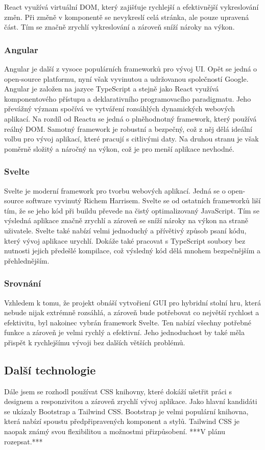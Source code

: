React využívá virtuální DOM, který zajišťuje rychlejší a efektivnější vykreslování změn. Při změně v komponentě se nevykreslí celá stránka, ale pouze upravená část. Tím se značně zrychlí vykreslování a zároveň sníží nároky na výkon.\cite{what_react_is_and_why_it_matters, angular_vs_react}

\subsubsection{Angular}
Angular je další z vysoce populárních frameworků pro vývoj UI. Opět se jedná o open-source platformu, nyní však vyvinutou a udržovanou společností Google. Angular je založen na jazyce TypeScript a stejně jako React využívá komponentového přístupu a deklarativního programovacího paradigmatu. Jeho převážný význam spočívá ve vytváření rozsáhlých dynamických webových aplikací. Na rozdíl od Reactu se jedná o plněhodnotný framework, který používá reálný DOM. Samotný framework je robustní a bezpečný, což z něj dělá ideální volbu pro vývoj aplikací, které pracují s citlivými daty. Na druhou stranu je však poměrně složitý a náročný na výkon, což je pro menší aplikace nevhodné.\cite{angular_vs_react, what_is_angular}

\subsubsection{Svelte}
Svelte je moderní framework pro tvorbu webových aplikací. Jedná se o open-source software vyvinutý Richem Harrisem. Svelte se od ostatních frameworků liší tím, že se jeho kód při buildu převede na čistý optimalizovaný JavaScript. Tím se výsledná aplikace značně zrychlí a zároveň se sníží nároky na výkon na straně uživatele. Svelte také nabízí velmi jednoduchý a přívětivý způsob psaní kódu, který vývoj aplikace urychlí. Dokáže také pracovat s TypeScript soubory bez nutnosti jejich předešlé kompilace, což výsledný kód dělá mnohem bezpečnějším a přehlednějším.\cite{svelte_and_why_you_should_consider_it}

\subsubsection{Srovnání}
Vzhledem k tomu, že projekt obnáší vytvořiení GUI pro hybridní stolní hru, která nebude nijak extrémně rozsáhlá, a zároveň bude potřebovat co největší rychlost a efektivitu, byl nakoinec vybrán framework Svelte. Ten nabízí všechny potřebné funkce a zároveň je velmi rychlý a efektivní. Jeho jednoduchost by také měla přispět k rychlejšímu vývoji bez dalších větších problémů.

\subsection{Další technologie}
Dále jsem se rozhodl používat CSS knihovny, které dokáží ušetřit práci s designem a responzivitou a zároveň zrychlí vývoj aplikace. Jako hlavní kandidáti se ukázaly Bootstrap a Tailwind CSS. Bootstrap je velmi populární knihovna, která nabízí spoustu předpřipravených komponent a stylů. Tailwind CSS je naopak známý svou flexibilitou a možnostmi přizpůsobení.
***V plánu rozepsat.***